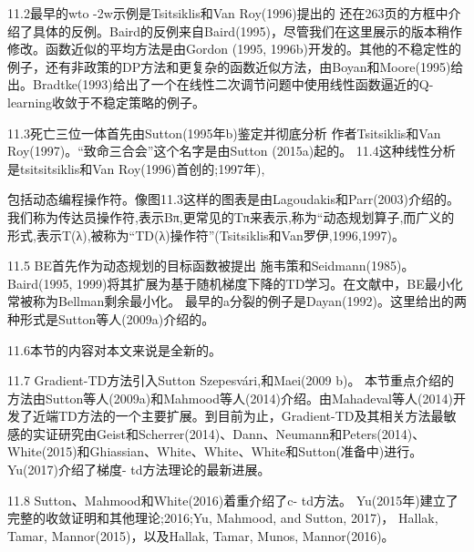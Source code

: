 11.2最早的wto -2w示例是Tsitsiklis和Van Roy(1996)提出的
还在263页的方框中介绍了具体的反例。Baird的反例来自Baird(1995)，尽管我们在这里展示的版本稍作修改。函数近似的平均方法是由Gordon (1995, 1996b)开发的。其他的不稳定性的例子，还有非政策的DP方法和更复杂的函数近似方法，由Boyan和Moore(1995)给出。Bradtke(1993)给出了一个在线性二次调节问题中使用线性函数逼近的Q-learning收敛于不稳定策略的例子。

11.3死亡三位一体首先由Sutton(1995年b)鉴定并彻底分析
作者Tsitsiklis和Van Roy(1997)。“致命三合会”这个名字是由Sutton (2015a)起的。
11.4这种线性分析是tsitsitsiklis和Van Roy(1996)首创的;1997年),

包括动态编程操作符。像图11.3这样的图表是由Lagoudakis和Parr(2003)介绍的。
我们称为传达员操作符,表示Bπ,更常见的Tπ来表示,称为“动态规划算子,而广义的形式,表示T(λ),被称为“TD(λ)操作符”(Tsitsiklis和Van罗伊,1996,1997)。

11.5 BE首先作为动态规划的目标函数被提出
施韦策和Seidmann(1985)。Baird(1995, 1999)将其扩展为基于随机梯度下降的TD学习。在文献中，BE最小化常被称为Bellman剩余最小化。
最早的a分裂的例子是Dayan(1992)。这里给出的两种形式是Sutton等人(2009a)介绍的。

11.6本节的内容对本文来说是全新的。

11.7 Gradient-TD方法引入Sutton Szepesvári,和Maei(2009 b)。
本节重点介绍的方法由Sutton等人(2009a)和Mahmood等人(2014)介绍。由Mahadeval等人(2014)开发了近端TD方法的一个主要扩展。到目前为止，Gradient-TD及其相关方法最敏感的实证研究由Geist和Scherrer(2014)、Dann、Neumann和Peters(2014)、White(2015)和Ghiassian、White、White、White和Sutton(准备中)进行。Yu(2017)介绍了梯度- td方法理论的最新进展。

11.8 Sutton、Mahmood和White(2016)着重介绍了c- td方法。
Yu(2015年)建立了完整的收敛证明和其他理论;2016;Yu, Mahmood, and Sutton, 2017)， Hallak, Tamar, Mannor(2015)，以及Hallak, Tamar, Munos, Mannor(2016)。
